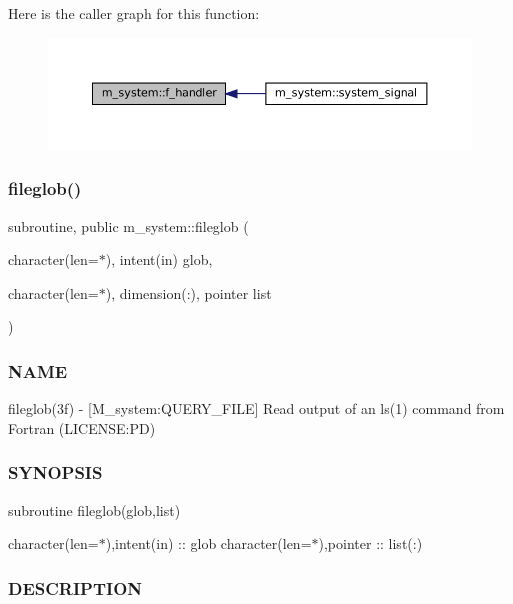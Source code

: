 Here is the caller graph for this function\+:
\nopagebreak
\begin{figure}[H]
\begin{center}
\leavevmode
\includegraphics[width=350pt]{namespacem__system_a078c9adfb12b36e88534248e99ed9fcc_icgraph}
\end{center}
\end{figure}
\mbox{\label{namespacem__system_a79656f76ad75168302e0d770052e901e}} 
\subsubsection{\texorpdfstring{fileglob()}{fileglob()}}
{\footnotesize\ttfamily subroutine, public m\+\_\+system\+::fileglob (\begin{DoxyParamCaption}\item[{character(len=$\ast$), intent(in)}]{glob,  }\item[{character(len=$\ast$), dimension(\+:), pointer}]{list }\end{DoxyParamCaption})}



\subsubsection*{N\+A\+ME}

fileglob(3f) -\/ \mbox{[}M\+\_\+system\+:Q\+U\+E\+R\+Y\+\_\+\+F\+I\+LE\mbox{]} Read output of an ls(1) command from Fortran (L\+I\+C\+E\+N\+SE\+:PD) 

\subsubsection*{S\+Y\+N\+O\+P\+S\+IS}

subroutine fileglob(glob,list)

character(len=$\ast$),intent(in) \+:\+: glob character(len=$\ast$),pointer \+:\+: list(\+:)

\subsubsection*{D\+E\+S\+C\+R\+I\+P\+T\+I\+ON}

